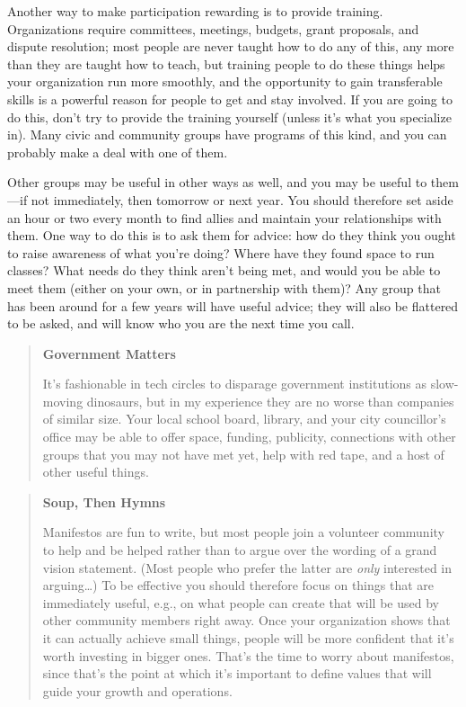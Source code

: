 Another way to make participation rewarding is to provide training.
Organizations require committees, meetings, budgets, grant proposals,
and dispute resolution; most people are never taught how to do any of
this, any more than they are taught how to teach, but training people to
do these things helps your organization run more smoothly, and the
opportunity to gain transferable skills is a powerful reason for people
to get and stay involved. If you are going to do this, don't try to
provide the training yourself (unless it's what you specialize in). Many
civic and community groups have programs of this kind, and you can
probably make a deal with one of them.

Other groups may be useful in other ways as well, and you may be useful
to them---if not immediately, then tomorrow or next year. You should
therefore set aside an hour or two every month to find allies and
maintain your relationships with them. One way to do this is to ask them
for advice: how do they think you ought to raise awareness of what
you're doing? Where have they found space to run classes? What needs
do they think aren't being met, and would you be able to meet them
(either on your own, or in partnership with them)? Any group that has
been around for a few years will have useful advice; they will also be
flattered to be asked, and will know who you are the next time you call.

\begin{quote}\setlength{\parindent}{0pt}
\textbf{Government Matters}

It's fashionable in tech circles to disparage government institutions
as slow-moving dinosaurs, but in my experience they are no worse than
companies of similar size. Your local school board, library, and your
city councillor's office may be able to offer space, funding,
publicity, connections with other groups that you may not have met
yet, help with red tape, and a host of other useful things.
\end{quote}

\begin{quote}\setlength{\parindent}{0pt}
\textbf{Soup, Then Hymns}

Manifestos are fun to write, but most people join a volunteer
community to help and be helped rather than to argue over the wording
of a grand vision statement. (Most people who prefer the latter are
\emph{only} interested in arguing\ldots{}) To be effective you should
therefore focus on things that are immediately useful, e.g., on what
people can create that will be used by other community members right
away. Once your organization shows that it can actually achieve small
things, people will be more confident that it's worth investing in
bigger ones. That's the time to worry about manifestos, since that's
the point at which it's important to define values that will guide
your growth and operations.
\end{quote}

